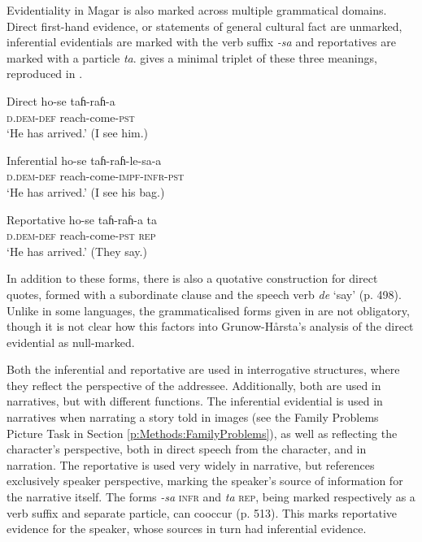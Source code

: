 Evidentiality in Magar is also marked across multiple grammatical domains. Direct first-hand evidence, or statements of general cultural fact are unmarked, inferential evidentials are marked with the verb suffix \textit{-sa} and reportatives are marked with a particle \textit{ta}.  gives a minimal triplet of these three meanings, reproduced in .

\begin{exe}
  \ex \label{e:Methods:MagarEvidIntro}
  \begin{xlist}
    \ex Direct
    \gll ho-se taɦ-raɦ-a \\
    \textsc{d.dem-def} reach-come-\textsc{pst} \\
    \glt `He has arrived.' (I see him.)

    \ex Inferential
    \gll ho-se taɦ-raɦ-le-sa-a \\
    \textsc{d.dem-def} reach-come-\textsc{impf-infr-pst} \\
    \glt `He has arrived.' (I see his bag.)

    \ex Reportative
    \gll ho-se taɦ-raɦ-a ta \\
    \textsc{d.dem-def} reach-come-\textsc{pst} \textsc{rep} \\
    \glt `He has arrived.' (They say.)
  \end{xlist}
  \cite[Magar,][497]{GrunowHarsta2008}
\end{exe}

In addition to these forms, there is also a quotative construction for direct quotes, formed with a subordinate clause and the speech verb \textit{de} `say' (p. 498). Unlike in some languages, the grammaticalised forms given in  are not obligatory, though it is not clear how this factors into Grunow-Hårsta's analysis of the direct evidential as null-marked.

Both the inferential and reportative are used in interrogative structures, where they reflect the perspective of the addressee. Additionally, both are used in narratives, but with different functions. The inferential evidential is used in narratives when narrating a story told in images (see the Family Problems Picture Task in Section \ref{p:Methods:FamilyProblems}), as well as reflecting the character's perspective, both in direct speech from the character, and in narration. The reportative is used very widely in narrative, but references exclusively speaker perspective, marking the speaker's source of information for the narrative itself. The forms \textit{-sa} \textsc{infr} and \textit{ta} \textsc{rep}, being marked respectively as a verb suffix and separate particle, can cooccur (p. 513). This marks reportative evidence for the speaker, whose sources in turn had inferential evidence.

